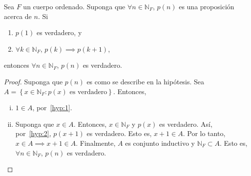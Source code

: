 \begin{frame}
	\begin{theorem}
		Sea $F$ un \alert{cuerpo ordenado}.
		Suponga que $\forall n\in\mathbb{N}_{F}$, $p\left(n\right)$ es
		una proposición acerca de $n$.
		Si

		\begin{multicols}{2}
			\begin{enumerate}[(1)]
				\item\label{hyp:1}

				$p\left(1\right)$ es verdadero, y

				\item\label{hyp:2}

				$\forall k\in\mathbb{N}_{F}$,
				$p\left(k\right)\implies p\left(k+1\right)$,
			\end{enumerate}
		\end{multicols}

		entonces $\forall n\in\mathbb{N}_{F}$, $p\left(n\right)$ es
		verdadero.
	\end{theorem}

	\begin{proof}
		Suponga que $p\left(n\right)$ es como se describe en la
		hipótesis.
		Sea
		\begin{math}
			A=
			\left\{
			x\in\mathbb{N}_{F}:
			p\left(x\right)\text{ es verdadero}
			\right\}
		\end{math}.
		Entonces,
		\begin{enumerate}[(i)]
			\item

			      $1\in A$, por~\eqref{hyp:1}.

			\item

			      Suponga que $x\in A$. Entonces, $x\in\mathbb{N}_{F}$ y
			      $p\left(x\right)$ es verdadero.
			      Así, por~\eqref{hyp:2}, $p\left(x+1\right)$ es verdadero.
			      Esto es, $x+1\in A$.
			      Por lo tanto, $x\in A\implies x+1\in A$.
			      Finalmente, $A$ es conjunto inductivo y
			      $\mathbb{N}_{F}\subset A$.
			      Esto es, $\forall n\in\mathbb{N}_{F}$, $p\left(n\right)$
			      es verdadero.
		\end{enumerate}
	\end{proof}
\end{frame}
